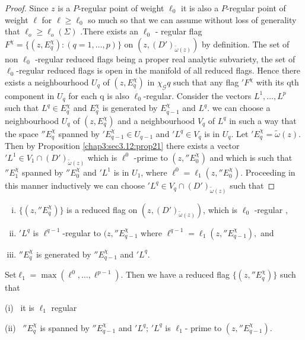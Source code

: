 \begin{proof}
  Since $z$ is a $P$-regular point of weight $ \ell_0 $ it is also a
  $P$-regular point of weight $ \ell $ for $  \ell \geq \ell_0 $ so
  much so that we can assume without loss of generality that
  $\ell_o\geq \ell_o (\Sigma)$ .There exists an $\ell_0 $ - regular flag
  $F^\chi = \{ (z,E^\chi _q): (q=1, \ldots ,p)\} $ on $ (z,
  (D')_{\tilde\omega(z)})$ by definition. The set of non $\ell_0$
  -regular reduced flags being a proper real analytic subvariety, the
  set of $\ell_0$-regular reduced flags  is open in the manifold of
  all reduced flags. Hence there exists a neighbourhood $U_q$ of
  $(z, E^\chi _q)$ in $\chi_\mathscr{G} q $ such that any flag $'F^\chi $
  with its qth component in $U_q$ for each q is also
  $\ell_0$-regular. Consider the vectors $L^1,\ldots , L^p$ such that
  $L^q \in E^\chi _q $ and $E^\chi _q $ is generated by $E^\chi _{q-1}
  $ and $L^q$. we can choose a neighbourhood $U_q $ of $ (z,E^\chi _q
  ) $ and a neighbourhood $V_q$ of $L^q $ in such a way that the space
  ${''E}^\chi_q $ spanned by ${'E}^\chi_{q-1} \in U_{q-1}$  and  $'L^q
  \in  V_q $ is in $U_q$. Let ${'E}^\chi_q
  = \tilde{\omega}(z)$. Then by Proposition \ref{chap3:sec3.12:prop21}
  there exists a vector 
  $'L^1 \in V_1 \cap (D')_{\tilde\omega (z)}$  which is $\ell^0 $
  -prime to $ (z,{''E}^\chi_0)$ and which is such that ${''E}^\chi_1$
  spanned by ${''E}^\chi_0$  and $'L^1$ is in $U_1$, where
  $\ell^0=\ell_1(z,{''E}^\chi_0)$. Proceeding in this manner inductively
  we can choose $'L^q \in V_q \cap (D')_{\tilde\omega(z)}$ such that  
\end{proof}

\begin{enumerate}[(i)]
\item $\{(z,{''E}^\chi_q )\}$  is a reduced flag on $
  (z,(D')_{\tilde\omega (z)})$, which is $\ell_0 $ -regular , 
\item $'L^q$ is $\ell^{q-1}$-regular to $(z,{''E}^\chi_{q-1}$ where
  $\ell^{q-1}= \ell_1(z,{''E}^\chi_{q-1}),$ and  
\item ${''E}^\chi_q$ is generated by ${''E}^\chi_{q-1}$ and ${'L}^q$.
\end{enumerate}

Set\pageoriginale $\ell_1 = \max (\ell^0 , \ldots , \ell^{p-1})$. Then we have a
reduced flag $\{(z, {''E}_q^\chi)\}$ such that  

(i)~ it is $\ell_1$ regular

(ii)~ ${''E}^\chi_q$ is spanned by ${''E}^\chi_{q-1}$ and $'L^q$; ${'L}^q$ is
$\ell_1$- prime to $(z, {''E}^\chi_{q-1})$.  

